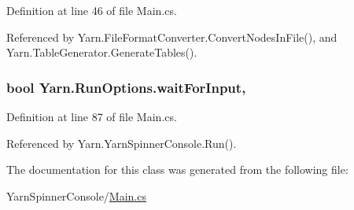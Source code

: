 Definition at line 46 of file Main.\-cs.



Referenced by Yarn.\-File\-Format\-Converter.\-Convert\-Nodes\-In\-File(), and Yarn.\-Table\-Generator.\-Generate\-Tables().

\hypertarget{a00159_a4b385e83338d14947c4d840d2d1ee266}{
\subsubsection[{wait\-For\-Input}]{\setlength{\rightskip}{0pt plus 5cm}bool Yarn.\-Run\-Options.\-wait\-For\-Input\hspace{0.3cm}{\ttfamily [get]}, {\ttfamily [set]}}}\label{a00159_a4b385e83338d14947c4d840d2d1ee266}


Definition at line 87 of file Main.\-cs.



Referenced by Yarn.\-Yarn\-Spinner\-Console.\-Run().



The documentation for this class was generated from the following file\-:\begin{DoxyCompactItemize}
\item 
Yarn\-Spinner\-Console/\hyperlink{a00328}{Main.\-cs}\end{DoxyCompactItemize}
